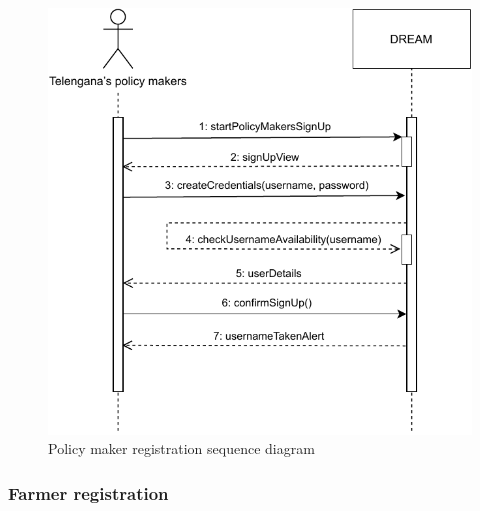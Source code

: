 \documentclass[../../main.tex]{subfiles}
\begin{document}
      \begin{figure}[H]
        \centering
        \includegraphics[width=\textwidth]{RASD/image/Sequence_Diagram_Policy_maker.pdf}
        \caption{Policy maker registration sequence diagram}
      \end{figure}

      \subsubsection{Farmer registration}
\end{document}
